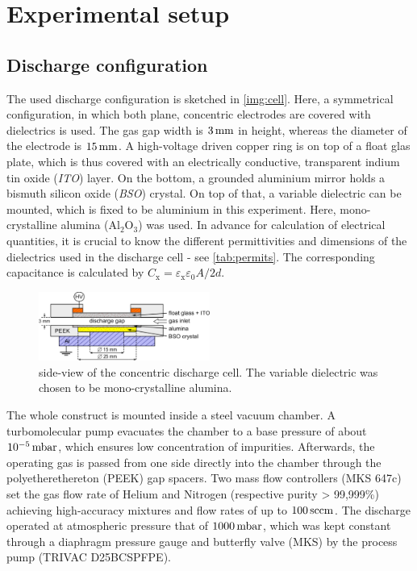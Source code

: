 \documentclass[a4paper,10pt,twoside]{article}
\newcommand{\tenpo}[1]{ 10^{#1}}
\newcommand{\ix}[1]{_\text{#1}}
\newcommand{\tilt}[1]{\textit{#1}}
\begin{document}
	\section{Experimental setup}
	
		\subsection{Discharge configuration}
		
			The used discharge configuration is sketched in \autoref{img:cell}. Here, a symmetrical configuration, in which both plane, concentric electrodes are covered with dielectrics is used. The gas gap width is $\unit[3]{mm}$ in height, whereas the diameter of the electrode is $\unit[15]{mm}$. A high-voltage driven copper ring is on top of a float glas plate, which is thus covered with an electrically conductive, transparent indium tin oxide  (\tilt{ITO}) layer. On the bottom, a grounded aluminium mirror holds a bismuth silicon oxide (\tilt{BSO}) crystal. On top of that, a variable dielectric can be mounted, which is fixed to be aluminium in this experiment. Here, mono-crystalline alumina (Al$_2$O$_3$) was used. In advance for calculation of electrical quantities, it is crucial to know the different permittivities and dimensions of the dielectrics used in the discharge cell  - see \autoref{tab:permits}. The corresponding capacitance is calculated by $C\ix{x}=\varepsilon\ix{x}\varepsilon_0 A/2d$.
			
				\begin{figure}[t!]
					\centering
					\includegraphics[width=0.5\textwidth]{figures/setup/discharge_cell.pdf}
					\caption{side-view of the concentric discharge cell. The variable dielectric was chosen to be mono-crystalline alumina.}
					\label{img:cell}
				\end{figure}
			
			The whole construct is mounted inside a steel vacuum chamber. A turbomolecular pump evacuates the chamber to a base pressure of about $\unit[\tenpo{-5}]{mbar}$, which ensures low concentration of impurities. Afterwards, the operating gas is passed from one side directly into the chamber through the polyetherethereton (PEEK) gap spacers. Two mass flow controllers (MKS 647c) set the gas flow rate of Helium and Nitrogen (respective purity > 99,999\%) achieving high-accuracy mixtures and flow rates of up to $\unit[100]{sccm}$. The discharge operated at atmospheric pressure that of $\unit[1000]{mbar}$, which was kept constant through a diaphragm pressure gauge and butterfly valve (MKS) by the process pump (TRIVAC D25BCSPFPE).
				
\end{document}
